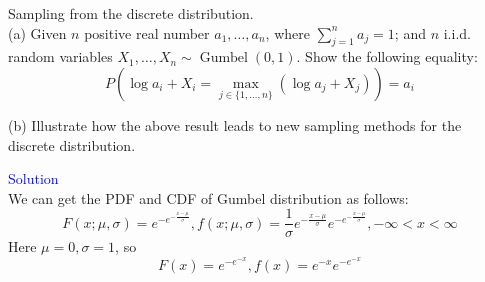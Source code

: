 \begin{homeworkProblem}

Sampling from the discrete distribution. \\
(a) Given $n$ positive real number $a_1, \ldots, a_n$, where $\sum\limits_{j=1}^n a_j=1$; and $n$ i.i.d. random variables $X_1, \ldots, X_n \sim \operatorname{Gumbel}(0,1)$. Show the following equality:
$$P\left(\log a_i+X_i=\max _{j \in\{1, \ldots, n\}}\left(\log a_j+X_j\right)\right)=a_i$$

(b) Illustrate how the above result leads to new sampling methods for the discrete distribution.

\textcolor{blue}{Solution} \\

We can get the PDF and CDF of Gumbel distribution as follows:
$$F(x;\mu, \sigma) = e^{-e^{-\frac{x-\mu}{\sigma}}}, f(x;\mu,\sigma) = \frac{1}{\sigma}e^{-\frac{x-\mu}{\sigma}}e^{-e^{-\frac{x-\mu}{\sigma}}}, -\infty<x<\infty$$
Here $\mu=0, \sigma=1$, so
$$F(x)=e^{-e^{-x}}, f(x)=e^{-x}e^{-e^{-x}}$$


\end{homeworkProblem}
